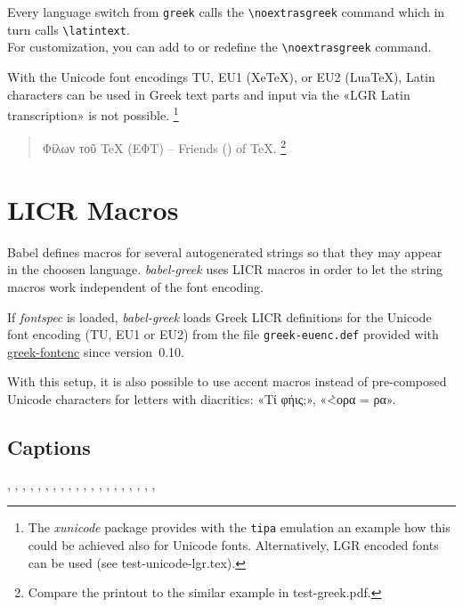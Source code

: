 \documentclass[a4paper]{article}
\begin{document}
Every language switch from \texttt{greek} calls the \verb|\noextrasgreek|
command which in turn calls \verb|\latintext|.\\
For customization, you can
add to or redefine the \verb|\noextrasgreek| command.

With the Unicode font encodings TU, EU1 (XeTeX), or EU2 (LuaTeX),
Latin characters can be used in Greek text parts and
input via the «LGR Latin transcription» is not possible.%
\footnote{%
  The \emph{xunicode} package provides with the \texttt{tipa} emulation an
  example how this could be achieved also for Unicode fonts. Alternatively,
  LGR encoded fonts can be used (see test-unicode-lgr.tex).
}

\begin{quote}
  \greekscript Φίλων τοῦ \textlatin{TeX} (ΕΦΤ) --
  \latintext Friends () of TeX.%
  \footnote{Compare the printout to the similar example in test-greek.pdf.}
\end{quote}

\section{LICR Macros}

Babel defines macros for several autogenerated strings so that they may
appear in the choosen language. \emph{babel-greek} uses LICR macros in
order to let the string macros work independent of the font encoding.

If \emph{fontspec} is loaded, \emph{babel-greek} loads Greek LICR
definitions for the Unicode font encoding (TU, EU1 or EU2) from the file
\texttt{greek-euenc.def} provided with
\href{http://www.ctan.org/pkg/greek-fontenc}{greek-fontenc} since
version~0.10.

With this setup, it is also possible to use accent macros instead of
pre-composed Unicode characters for letters with diacritics:
«Τ\'ι φ\'ηις;», «\`<ορα = ρα».


\subsection{Captions}

\prefacename,
\refname,
\abstractname,
\bibname,
\chaptername,
\appendixname,
\contentsname,
\listfigurename ,
\listtablename,
\indexname,
\figurename,
\tablename,
\partname,
\enclname,
\ccname,
\headtoname,
\pagename,
\seename,
\alsoname,
\proofname,
\glossaryname
{}
\end{document}
